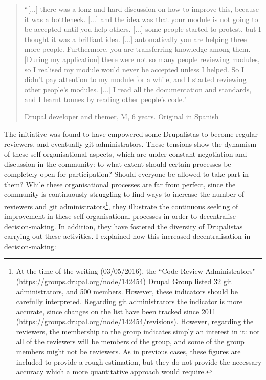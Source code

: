 \begin{quotation}
``[...] there was a long and hard discussion on how to improve this, because it was a bottleneck. [...] and the idea was that your module is not going to be accepted until you help others. [...] some people started to protest, but I thought it was a brilliant idea. [...] automatically you are helping three more people. Furthermore, you are transferring knowledge among them. [During my application] there were not so many people reviewing modules, so I realised my module would never be accepted unless I helped. So I didn't pay attention to my module for a while, and I started reviewing other people's modules. [...] I read all the documentation and standards, and I learnt tonnes by reading other people's code."
\begin{flushright}\footnotesize{Drupal developer and themer, M, 6 years. Original in Spanish}\end{flushright}
\end{quotation}

The initiative was found to have empowered some Drupalistas to become regular reviewers, and eventually git administrators.  These tensions show the dynamism of these self-organisational aspects, which are under constant negotiation and discussion in the community: to what extent should certain processes be completely open for participation?  Should everyone be allowed to take part in them? While these organisational processes are far from perfect, since the community is continuously struggling to find ways to increase the number of reviewers and git administrators\footnote{At the time of the writing (03/05/2016), the ``Code Review Administrators" (\url{https://groups.drupal.org/node/142454}) Drupal Group listed 32 git administrators, and 500 members. However, these indicators should be carefully interpreted. Regarding git administrators the indicator is more accurate, since changes on the list have been tracked since 2011 (\url{https://groups.drupal.org/node/142454/revisions}). However, regarding the reviewers, the membership to the group indicates simply an interest in it: not all of the reviewers will be members of the group, and some of the group members might not be reviewers. As in previous cases, these figures are included to provide a rough estimation, but they do not provide the necessary accuracy which a more quantitative approach would require.}, they illustrate the continuous seeking of improvement in these self-organisational processes in order to decentralise decision-making. In addition, they have fostered the diversity of Drupalistas carrying out these activities. I explained how this increased decentralisation in decision-making:

